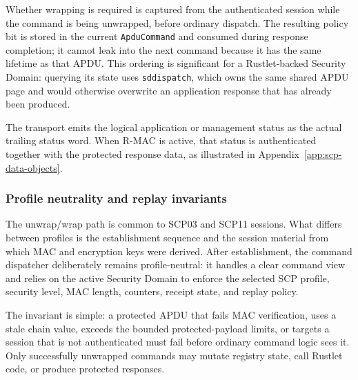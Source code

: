 Whether wrapping is required is captured from the authenticated session while
the command is being unwrapped, before ordinary dispatch. The resulting policy
bit is stored in the current \texttt{ApduCommand} and consumed during response
completion; it cannot leak into the next command because it has the same
lifetime as that APDU. This ordering is significant for a Rustlet-backed
Security Domain: querying its state uses \texttt{sddispatch}, which owns the
same shared APDU page and would otherwise overwrite an application response
that has already been produced.

The transport emits the logical application or management status as the
actual trailing status word. When R-MAC is active, that status is
authenticated together with the protected response data, as illustrated in
Appendix~\ref{app:scp-data-objects}.

\subsubsection{Profile neutrality and replay invariants}

The unwrap/wrap path is common to SCP03 and SCP11 sessions. What differs
between profiles is the establishment sequence and the session material from
which MAC and encryption keys were derived. After establishment, the command
dispatcher deliberately remains profile-neutral: it handles a clear command
view and relies on the active Security Domain to enforce the selected SCP
profile, security level, MAC length, counters, receipt state, and replay
policy.

The invariant is simple: a protected APDU that fails MAC verification, uses a
stale chain value, exceeds the bounded protected-payload limits, or targets a session
that is not authenticated must fail before ordinary command logic sees it.
Only successfully unwrapped commands may mutate registry state, call Rustlet
code, or produce protected responses.

